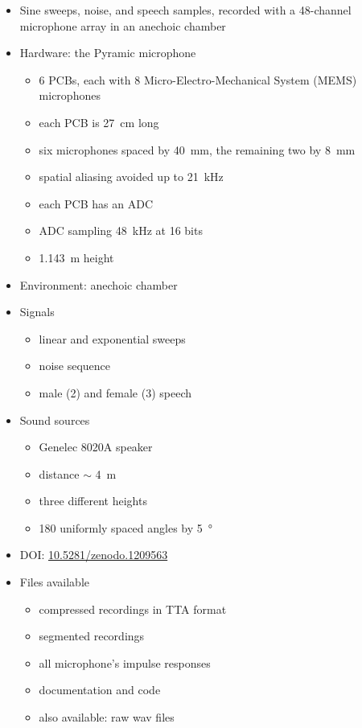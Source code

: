 \documentclass[14pt, legalpaper]{extarticle}
\begin{document}
\begin{itemize}

\item Sine sweeps, noise, and speech samples, recorded with a 48-channel microphone array in an anechoic chamber \cite{scheibler2018pyramic}

\item Hardware: the Pyramic microphone \cite{scheibler2018pyramic}
	\begin{itemize}
	\item 6 PCBs, each with 8 Micro-Electro-Mechanical System (MEMS) microphones 
	\item each PCB is \SI{27}{\centi\metre} long
	\item six microphones spaced by \SI{40}{\milli\metre}, the remaining two by \SI{8}{\milli\metre}
	\item spatial aliasing avoided up to \SI{21}{\kilo\hertz}
	\item each PCB has an ADC
	\item ADC sampling \SI{48}{\kilo\hertz} at 16 bits
	\item \SI{1.143}{\metre} height
	\end{itemize}

\item Environment: anechoic chamber
	
\item Signals
	\begin{itemize}
	\item linear and exponential sweeps
	\item noise sequence
	\item male (2) and female (3) speech
	\end{itemize}

\item Sound sources
	\begin{itemize}
	\item Genelec 8020A speaker
	\item distance $\sim$ \SI{4}{\metre}
	\item three different heights
	\item 180 uniformly spaced angles by \SI{5}{\degree}
	\end{itemize}

\item DOI: \href{https://zenodo.org/record/1209563}{10.5281/zenodo.1209563}

\item Files available
	\begin{itemize}
	\item compressed recordings in TTA format
	\item segmented recordings
	\item all microphone's impulse responses
	\item documentation and code
	\item also available: raw wav files
	\end{itemize}

\end{itemize}
\end{document}
